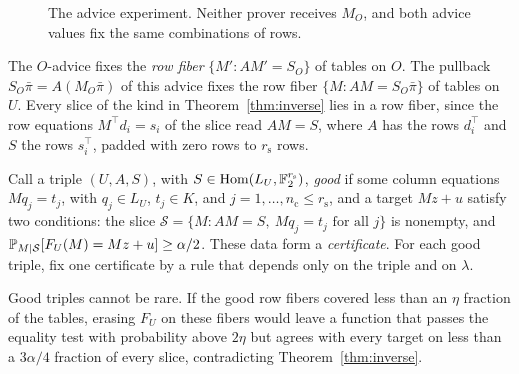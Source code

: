 \begin{figure}[ht]
\centering
{}
\caption{The advice experiment. Neither prover receives $M_O$, and both advice values fix the same combinations of rows.}\label{fig:advice}
\end{figure}

The $O$-advice fixes the \emph{row fiber} $\{M':AM'=S_O\}$ of tables on $O$. The pullback $S_O\bar\pi=A(M_O\bar\pi)$ of this advice fixes the row fiber $\{M:AM=S_O\bar\pi\}$ of tables on $U$. Every slice of the kind in Theorem~\ref{thm:inverse} lies in a row fiber, since the row equations $M^\top d_i=s_i$ of the slice read $AM=S$, where $A$ has the rows $d_i^\top$ and $S$ the rows $s_i^\top$, padded with zero rows to $r_{\mathrm s}$ rows.

\label{nt:good}Call a triple $(U,A,S)$, with $S\in\operatorname{Hom}(L_U,\mathbb{F}_2^{r_{\mathrm s}})$, \emph{good} if some column equations $Mq_j=t_j$, with $q_j\in L_U$, $t_j\in K$, and $j=1,\dots,n_{\mathrm c}\le r_{\mathrm s}$, and a target $Mz+u$ satisfy two conditions: the slice $\mathcal S=\{M:AM=S,\ Mq_j=t_j\text{ for all }j\}$ is nonempty, and $\mathbb{P}_{M\mid\mathcal S}[F_U(M)=Mz+u]\ge\alpha/2$. These data form a \emph{certificate}. For each good triple, fix one certificate by a rule that depends only on the triple and on $\lambda$.

Good triples cannot be rare. If the good row fibers covered less than an $\eta$ fraction of the tables, erasing $F_U$ on these fibers would leave a function that passes the equality test with probability above $2\eta$ but agrees with every target on less than a $3\alpha/4$ fraction of every slice, contradicting Theorem~\ref{thm:inverse}.

